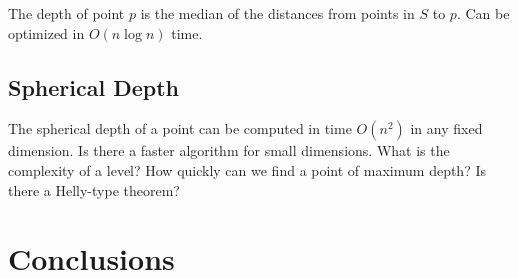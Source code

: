 \documentclass[lotsofwhite,charterfonts]{patmorin}
\begin{document}
The depth of point $p$ is the median of the distances from points in
$S$ to $p$.  Can be optimized in $O(n\log n)$ time.

\subsection{Spherical Depth} 
The spherical depth of a point can be computed in
time $O(n^2)$ in any fixed dimension.  Is there a faster algorithm for small
dimensions.  What is the complexity of a level?  How quickly can we find a
point of maximum depth?  Is there a Helly-type theorem?

\section{Conclusions}



\end{document}
